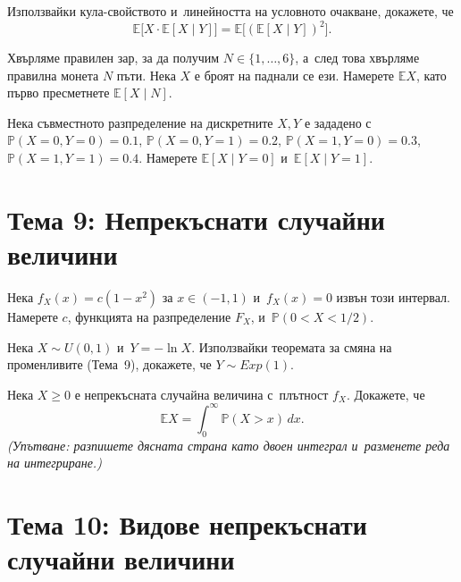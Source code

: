 \begin{probbox}[Задача 8.1]
Използвайки кула-свойството и~линейността на условното очакване,
докажете, че
\[
  \mathbb E\big[X\cdot \mathbb E[X\mid Y]\big] = \mathbb E\big[(\mathbb E[X\mid Y])^2\big].
\]
\end{probbox}

\begin{probbox}[Задача 8.2]
Хвърляме правилен зар, за да получим $N\in\{1,\dots,6\}$, а~след
това хвърляме правилна монета $N$ пъти. Нека $X$ е броят на паднали
се ези. Намерете $\mathbb EX$, като първо пресметнете $\mathbb E[X
\mid N]$.
\end{probbox}

\begin{probbox}[Задача 8.3]
Нека съвместното разпределение на дискретните $X,Y$ е зададено с~$\mathbb P(X=0,Y=0)=0.1$, $\mathbb P(X=0,Y=1)=0.2$, $\mathbb
P(X=1,Y=0)=0.3$, $\mathbb P(X=1,Y=1)=0.4$. Намерете $\mathbb E[X\mid
Y=0]$ и~$\mathbb E[X\mid Y=1]$.
\end{probbox}

\section*{Тема 9: Непрекъснати случайни величини}

\begin{probbox}[Задача 9.1]
Нека $f_X(x)=c(1-x^2)$ за $x\in(-1,1)$ и~$f_X(x)=0$ извън този
интервал. Намерете $c$, функцията на разпределение $F_X$, и~$\mathbb P(0<X<1/2)$.
\end{probbox}

\begin{probbox}[Задача 9.2]
Нека $X\sim U(0,1)$ и~$Y=-\ln X$. Използвайки теоремата за смяна на
променливите (Тема~9), докажете, че $Y\sim Exp(1)$.
\end{probbox}

\begin{probbox}[Задача 9.3]
Нека $X\ge0$ е непрекъсната случайна величина с~плътност $f_X$.
Докажете, че
\[
  \mathbb EX = \int_0^{\infty} \mathbb P(X>x)\,dx.
\]
\emph{(Упътване: разпишете дясната страна като двоен интеграл и~разменете реда на интегриране.)}
\end{probbox}

\section*{Тема 10: Видове непрекъснати случайни величини}

